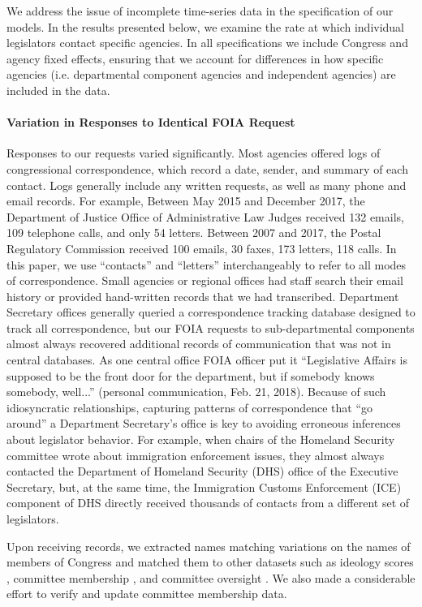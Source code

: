 \documentclass{article}
\begin{document}
We address the issue of incomplete time-series data in the specification of our models.  In the results presented below, we examine the rate at which individual legislators contact specific agencies. In all specifications we include Congress and agency fixed effects, ensuring that we account for differences in how specific agencies (i.e. departmental component agencies and independent agencies) are included in the data. 

\paragraph{Variation in Responses to Identical FOIA Request} Responses to our requests varied significantly. Most agencies offered logs of congressional correspondence, which record a date, sender, and summary of each contact. Logs generally include any written requests, as well as many phone and email records. For example, Between May 2015 and December 2017, the Department of Justice Office of Administrative Law Judges received 132 emails, 109 telephone calls, and only 54 letters. Between 2007 and 2017, the Postal Regulatory Commission received 100 emails, 30 faxes, 173 letters, 118 calls. In this paper, we use ``contacts'' and ``letters'' interchangeably to refer to all modes of correspondence. 
Small agencies or regional offices had staff search their email history or provided hand-written records that we had transcribed. 
Department Secretary offices generally queried a correspondence tracking database designed to track all correspondence, but our FOIA requests to sub-departmental components almost always recovered additional records of communication that was not in central databases. As one central office FOIA officer put it ``Legislative Affairs is supposed to be the front door for the department, but if somebody knows somebody, well...'' (personal communication, Feb. 21, 2018). Because of such idiosyncratic relationships, capturing patterns of correspondence that ``go around'' a Department Secretary's office is key to avoiding erroneous inferences about legislator behavior. For example, when chairs of the Homeland Security committee wrote about immigration enforcement issues, they almost always contacted the Department of Homeland Security (DHS) office of the Executive Secretary, but, at the same time, the Immigration Customs Enforcement (ICE) component of DHS directly received thousands of contacts from a different set of legislators. 

Upon receiving records, we extracted names matching variations on the names of members of Congress and matched them to other datasets such as ideology scores \citep{dwnominate2018}, committee membership \citep{StewartWoon2017}, and committee oversight \citep{LewisSelin2012}. We also made a considerable effort to verify and update committee membership data. 
\end{document}
